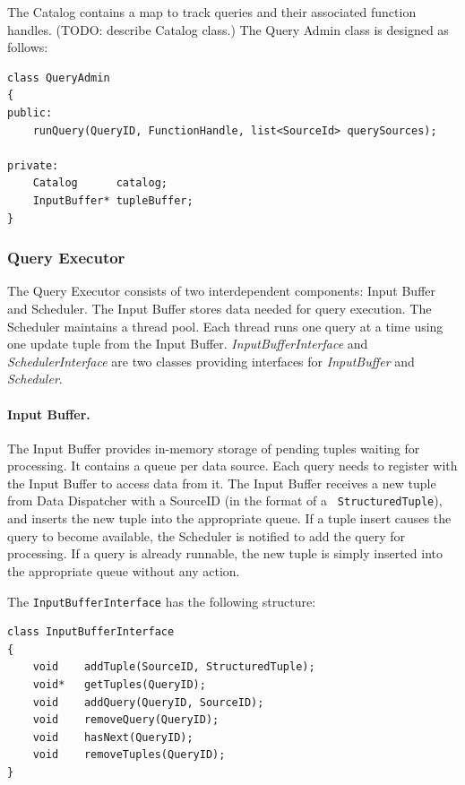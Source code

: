 \documentclass[14pt]{article}
\newcommand{\preliminary}[1]{\textcolor{prelim}{#1}}
\begin{document}
The Catalog contains a map to track queries and their associated function handles. 
\preliminary{(TODO: describe Catalog class.)}
The Query Admin class is designed as follows:
\begin{Verbatim}
class QueryAdmin
{
public:
    runQuery(QueryID, FunctionHandle, list<SourceId> querySources);

private:
    Catalog      catalog;
    InputBuffer* tupleBuffer;
}
\end{Verbatim}


\subsubsection{Query Executor}

The Query Executor consists of two interdependent components: Input Buffer and
Scheduler. The Input Buffer stores data needed for query execution. The
Scheduler maintains a thread pool. Each thread runs one query at a time using
one update tuple from the Input Buffer. \emph{InputBufferInterface} and
\emph{SchedulerInterface} are two classes providing interfaces for
\emph{InputBuffer} and \emph{Scheduler}.

\paragraph{Input Buffer.}

The Input Buffer provides in-memory storage of pending tuples waiting for
processing. It contains a queue per data source. Each query needs to register
with the Input Buffer to access data from it. The Input Buffer receives a new
tuple from Data Dispatcher with a SourceID (in the format of a {\tt
StructuredTuple}), and inserts the new tuple into the appropriate queue. If a
tuple insert causes the query to become available, the Scheduler is notified to
add the query for processing. If a query is already runnable, the new tuple is
simply inserted into the appropriate queue without any action.

\noindent The \texttt{InputBufferInterface} has the following structure:

\begin{Verbatim}
class InputBufferInterface
{
    void    addTuple(SourceID, StructuredTuple);
    void*   getTuples(QueryID);
    void    addQuery(QueryID, SourceID);
    void    removeQuery(QueryID);
    void    hasNext(QueryID);
    void    removeTuples(QueryID);
}
\end{Verbatim}
\end{document}

